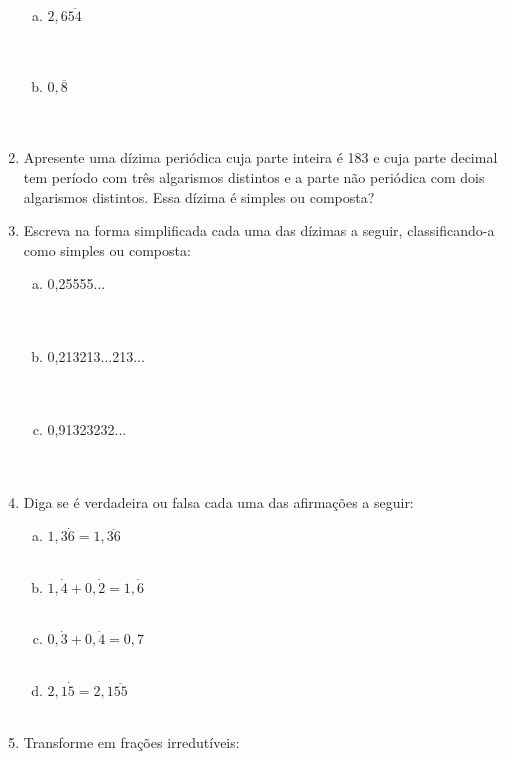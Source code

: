 \documentclass[a4paper,14pt]{article}
\begin{document}
\begin{multicols}{2}
\begin{enumerate}
\begin{enumerate}[a)]
				\item $2,6\overline{54}$ \\\\\\
				\item $0,\overline{8}$ \\\\\\
			\end{enumerate}
			\item Apresente uma dízima periódica cuja parte inteira é 183 e cuja parte decimal tem período com três algarismos distintos e a parte não periódica com dois algarismos distintos. Essa dízima é simples ou composta? \newpage
			\item Escreva na forma simplificada cada uma das dízimas a seguir, classificando-a como simples ou composta:
			\begin{enumerate}[a)]
				\item 0,25555... \\\\\\
				\item 0,213213...213... \\\\\\
				\item 0,91323232... \\\\\\
			\end{enumerate}
			\item Diga se é verdadeira ou falsa cada uma das afirmações a seguir:
			\begin{enumerate}[a)]
				\item $1,3\dot{6} = 1,\overline{36}$ \\\\
				\item $1,\dot{4} + 0,\dot{2} = 1,\dot{6}$ \\\\
				\item $0,\dot{3} + 0,\dot{4} = 0,7$ \\\\
				\item $2,1\dot{5} = 2,1\overline{55}$ \\\\
			\end{enumerate}
			\item Transforme em frações irredutíveis:
			\begin{enumerate}[a)]

\end{enumerate}
\end{enumerate}
\end{multicols}
\end{document}
